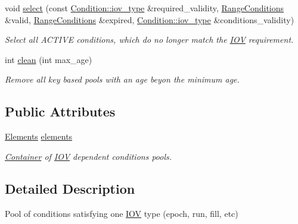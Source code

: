 \begin{DoxyCompactItemize}
void \hyperlink{class_d_d4hep_1_1_conditions_1_1_conditions_i_o_v_pool_ae7ff2198bcdc12e8be275d1aacc5cd0b}{select} (const \hyperlink{class_d_d4hep_1_1_conditions_1_1_condition_ad84300e226b2085ec5e9db7f47be5539}{Condition\+::iov\+\_\+type} \&required\+\_\+validity, \hyperlink{namespace_d_d4hep_1_1_conditions_ae765f0140a33973a430280f02b6062f4}{Range\+Conditions} \&valid, \hyperlink{namespace_d_d4hep_1_1_conditions_ae765f0140a33973a430280f02b6062f4}{Range\+Conditions} \&expired, \hyperlink{class_d_d4hep_1_1_conditions_1_1_condition_ad84300e226b2085ec5e9db7f47be5539}{Condition\+::iov\+\_\+type} \&conditions\+\_\+validity)
\begin{DoxyCompactList}\small\item\em Select all A\+C\+T\+I\+VE conditions, which do no longer match the \hyperlink{class_d_d4hep_1_1_i_o_v}{I\+OV} requirement. \end{DoxyCompactList}\item 
int \hyperlink{class_d_d4hep_1_1_conditions_1_1_conditions_i_o_v_pool_a3adc9fa6a89d3195b91b5fb11236f360}{clean} (int max\+\_\+age)
\begin{DoxyCompactList}\small\item\em Remove all key based pools with an age beyon the minimum age. \end{DoxyCompactList}\end{DoxyCompactItemize}
\subsection*{Public Attributes}
\begin{DoxyCompactItemize}
\item 
\hyperlink{class_d_d4hep_1_1_conditions_1_1_conditions_i_o_v_pool_aa011c5cc19bfb761be62adf9a88b5ee9}{Elements} \hyperlink{class_d_d4hep_1_1_conditions_1_1_conditions_i_o_v_pool_adf0b418e513769d438a8c91d766e86f4}{elements}
\begin{DoxyCompactList}\small\item\em \hyperlink{class_d_d4hep_1_1_conditions_1_1_container}{Container} of \hyperlink{class_d_d4hep_1_1_i_o_v}{I\+OV} dependent conditions pools. \end{DoxyCompactList}\end{DoxyCompactItemize}


\subsection{Detailed Description}
Pool of conditions satisfying one \hyperlink{class_d_d4hep_1_1_i_o_v}{I\+OV} type (epoch, run, fill, etc) 

